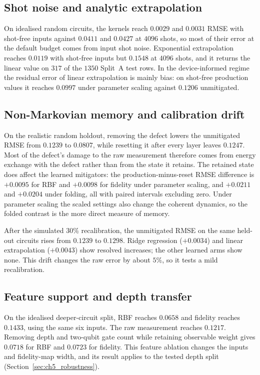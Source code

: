 \documentclass[Thesis.tex]{subfiles}
\begin{document}
\subsection{Shot noise and analytic extrapolation}

On idealised random circuits, the kernels reach $0.0029$ and $0.0031$ RMSE with
shot-free inputs against $0.0411$ and $0.0427$ at $4096$ shots, so most of their
error at the default budget comes from input shot noise. Exponential extrapolation
reaches $0.0119$ with shot-free inputs but $0.1548$ at $4096$ shots, and it returns
the linear value on $317$ of the $1350$ Split~A test rows. In the device-informed
regime the residual error of linear extrapolation is mainly bias: on shot-free
production values it reaches $0.0997$ under parameter scaling against $0.1206$
unmitigated.

\subsection{Non-Markovian memory and calibration drift}

On the realistic random holdout, removing the defect lowers the unmitigated RMSE from
$0.1239$ to $0.0807$, while resetting it after every layer leaves $0.1247$. Most of the
defect's damage to the raw measurement therefore comes from energy exchange with the
defect rather than from the state it retains. The retained state does affect the
learned mitigators: the production-minus-reset RMSE difference is $+0.0095$ for RBF
and $+0.0098$ for fidelity under parameter scaling, and $+0.0211$ and $+0.0204$ under
folding, all with paired intervals excluding zero. Under parameter scaling the scaled
settings also change the coherent dynamics, so the folded contrast is the more direct
measure of memory.

After the simulated $30\%$ recalibration, the unmitigated RMSE on the same held-out
circuits rises from $0.1239$ to $0.1298$. Ridge regression ($+0.0034$) and linear
extrapolation ($+0.0043$) show resolved increases; the other learned arms show none.
This drift changes the raw error by about $5\%$, so it tests a mild recalibration.

\subsection{Feature support and depth transfer}

On the idealised deeper-circuit split, RBF reaches $0.0658$
and fidelity reaches $0.1433$, using the same six inputs. The raw measurement
reaches $0.1217$. Removing depth and two-qubit gate count while retaining
observable weight gives $0.0718$ for RBF and $0.0723$ for fidelity. This feature
ablation changes the inputs and fidelity-map width, and its result applies to
the tested depth split (Section~\ref{sec:ch5_robustness}).
\end{document}
